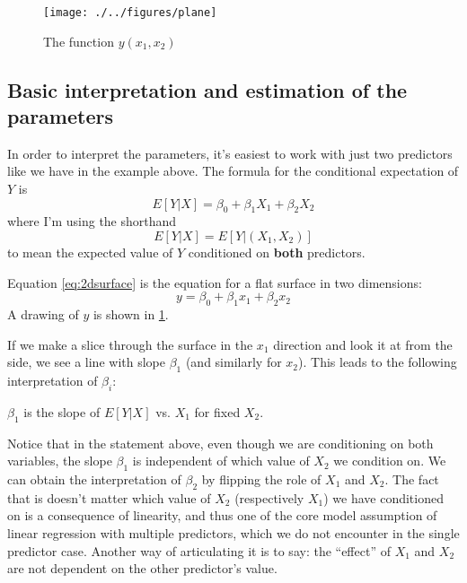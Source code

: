 \begin{figure}[h!]
    \centering
    \texttt{[image: ./../figures/plane]}
    \caption{The function $y(x_1,x_2)$}
    \label{fig:plane}
\end{figure}

\subsection{Basic interpretation and estimation of the parameters }
 In order to interpret the parameters, it's easiest to work with just two predictors like we have in the example above. The formula for the conditional expectation of $Y$ is 
\begin{equation}\label{eq:2dsurface}
E[Y|X] = \beta_0 + \beta_1X_1 + \beta_2X_2
\end{equation}
where I'm using the shorthand 
\begin{equation*}
E[Y|X] = E[Y|(X_1,X_2)]
\end{equation*}
to mean the expected value of $Y$ conditioned on {\bf both} predictors. 



Equation \ref{eq:2dsurface} is the equation for a flat surface in two dimensions: 
\begin{equation}
y = \beta_0 + \beta_1x_1 + \beta_2x_2
\end{equation}
A drawing of $y$ is shown in \ref{fig:plane}. 

 If we make a slice through the surface in the $x_1$ direction and look it at from the side, we see a line with slope $\beta_1$ (and similarly for $x_2$).  This leads to the following interpretation of $\beta_i$:  
 \begin{center}
 $\beta_1$ is the slope of $E[Y|X]$ vs. $X_1$ for fixed $X_2$. 
 \end{center}
Notice that in the statement above, even though we are conditioning on both variables, the slope $\beta_1$ is independent of which value of $X_2$ we condition on. We can obtain the interpretation of $\beta_2$ by flipping the role of $X_1$ and $X_2$. 
The fact that is doesn't matter which value of $X_2$ (respectively $X_1$) we have conditioned on is a consequence of linearity, and thus one of the core model assumption of linear regression with multiple predictors, which we do not encounter in the single predictor case. Another way of articulating it is to say: the ``effect'' of $X_1$ and $X_2$ are not dependent on the other predictor's value.






